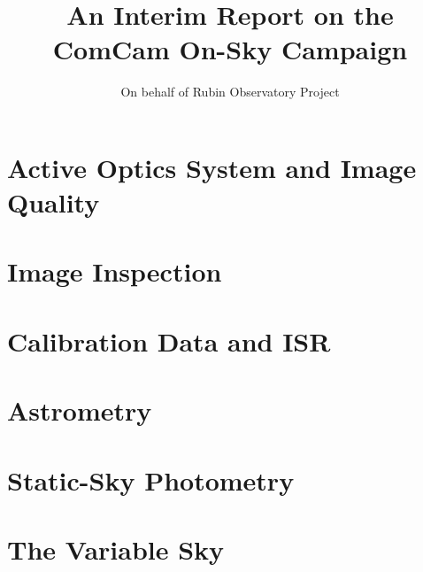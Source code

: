 \documentclass[SE,lsstdraft,authoryear,toc]{lsstdoc}
\title{An Interim Report on the ComCam On-Sky Campaign}
\author{%
On behalf of Rubin Observatory Project
}
\date{\vcsDate}
\begin{document}
\maketitle






\section{Active Optics System and Image Quality}






\section{Image Inspection}



\section{Calibration Data and ISR}





\section{Astrometry}



\section{Static-Sky Photometry}









\section{The Variable Sky}
\end{document}
